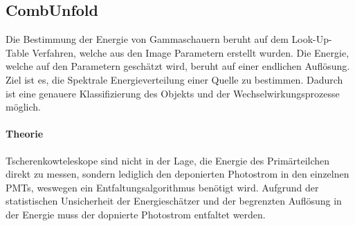 \subsection{CombUnfold}%
\label{sub:combunfold}
Die Bestimmung der Energie von Gammaschauern beruht auf dem Look-Up-Table
Verfahren,
welche aus den Image Parametern erstellt wurden.
Die Energie, welche auf den Parametern geschätzt wird, beruht auf einer
endlichen Auflösung.
Ziel ist es, die Spektrale Energieverteilung einer Quelle zu bestimmen.
Dadurch ist eine genauere Klassifizierung des Objekts und der
Wechselwirkungsprozesse möglich.

\paragraph{Theorie}%

Tscherenkowteleskope sind nicht in der Lage, die Energie
des Primärteilchen direkt zu messen,
sondern lediglich den deponierten Photostrom in den einzelnen PMTs,
weswegen ein Entfaltungsalgorithmus benötigt wird.
Aufgrund der statistischen Unsicherheit der Energieschätzer und der begrenzten
Auflösung in der Energie muss der dopnierte Photostrom entfaltet werden.




